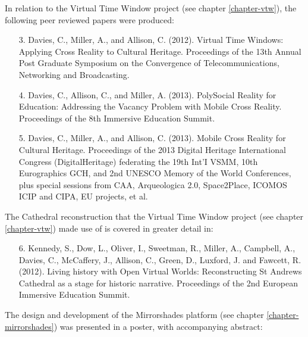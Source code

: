 
In relation to the Virtual Time Window project (see chapter \ref{chapter-vtw}), the following peer reviewed papers were produced:

\begin{itemize}

	\item [3.] Davies, C., Miller, A., and Allison, C. (2012). Virtual Time Windows: Applying Cross Reality to Cultural Heritage. Proceedings of the 13th Annual Post Graduate Symposium on the Convergence of Telecommunications, Networking and Broadcasting.
	
	\item [4.] Davies, C., Allison, C., and Miller, A. (2013). PolySocial Reality for Education: Addressing the Vacancy Problem with Mobile Cross Reality. Proceedings of the 8th Immersive Education Summit.

	\item [5.] Davies, C., Miller, A., and Allison, C. (2013). Mobile Cross Reality for Cultural Heritage. Proceedings of the 2013 Digital Heritage International Congress (DigitalHeritage) federating the 19th Int'I VSMM, 10th Eurographics GCH, and 2nd UNESCO Memory of the World Conferences, plus special sessions from CAA, Arqueologica 2.0, Space2Place, ICOMOS ICIP and CIPA, EU projects, et al.

\end{itemize}


The Cathedral reconstruction that the Virtual Time Window project (see chapter \ref{chapter-vtw}) made use of is covered in greater detail in:

\begin{itemize}

	\item [6.] Kennedy, S., Dow, L., Oliver, I., Sweetman, R., Miller, A., Campbell, A., Davies, C., McCaffery, J., Allison, C., Green, D., Luxford, J. and Fawcett, R. (2012). Living history with Open Virtual Worlds: Reconstructing St Andrews Cathedral as a stage for historic narrative. Proceedings of the 2nd European Immersive Education Summit.

\end{itemize}


The design and development of the Mirrorshades platform (see chapter \ref{chapter-mirrorshades}) was presented in a poster, with accompanying abstract:

